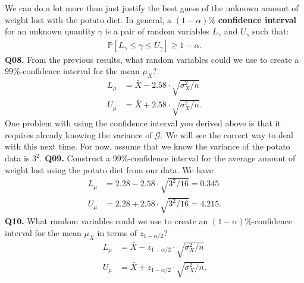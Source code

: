 \documentclass[12pt]{article}
\newcommand{\cblack}{\color{Black}}
\newcommand{\cblue}{\color{MidnightBlue}}
\begin{document}
We can do a lot more than just justify the best guess of the unknown amount of
weight lost with the potato diet. In general, a $(1 - \alpha)$\%
\textbf{confidence interval} for an unknown quantity $\gamma$ is a pair of random
variables $L_\gamma$ and $U_\gamma$ such that:
\begin{align*}
\mathbb{P}[L_\gamma \leq \gamma \leq U_\gamma] \geq 1 - \alpha.
\end{align*}
\textbf{Q08.} From the previous results, what random variables could we use to
create a $99$\%-confidence interval for the mean $\mu_X$? \cblue
\begin{align*}
L_\mu &= \bar{X} - 2.58 \cdot \sqrt{\sigma_X^2 / n} \\
U_\mu &= \bar{X} + 2.58 \cdot \sqrt{\sigma_X^2 / n}.
\end{align*}
\cblack One problem with using the confidence interval you derived above is
that it requires already knowing the variance of $\mathcal{G}$. We will see
the correct way to deal with this next time. For now, assume that we know
the variance of the potato data is $3^2$. \textbf{Q09.} Construct a 99\%-confidence
interval for the average amount of weight lost using the potato diet from our
data. \cblue We have:
\begin{align*}
L_\mu &= 2.28 - 2.58 \cdot \sqrt{3^2 / 16} = 0.345 \\
U_\mu &= 2.28 + 2.58 \cdot \sqrt{3^2 / 16} = 4.215.
\end{align*}
\cblack \textbf{Q10.} What random variables could we use to create an $(1-\alpha)$\%-confidence
interval for the mean $\mu_X$ in terms of $z_{1 - \alpha/2}$? \cblue 
\begin{align*}
L_\mu &= \bar{X} - z_{1 - \alpha/2} \cdot \sqrt{\sigma_X^2 / n} \\
U_\mu &= \bar{X} + z_{1 - \alpha/2} \cdot \sqrt{\sigma_X^2 / n}.
\end{align*}
\end{document}
